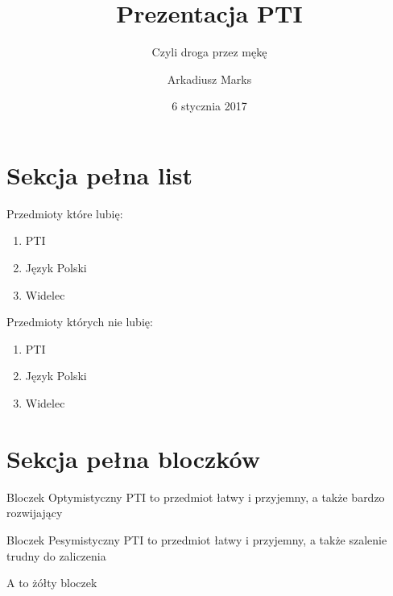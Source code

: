 \documentclass{beamer}
\title{Prezentacja PTI}
\subtitle {Czyli droga przez mękę}
\author{Arkadiusz Marks}
\institute{AiR I}
\date{6 stycznia 2017}
\begin{document}
\begin{frame}
	\maketitle
\end{frame}

\begin{frame} %
	\tableofcontents
\end{frame}


\section{Sekcja pełna list} 


\begin{frame}
	Przedmioty które lubię:
	\begin{enumerate}
		\item<1-> PTI
		\item<2-> Język Polski
		\item<3->	Widelec
	\end{enumerate}
\end{frame}

\begin{frame}
	Przedmioty których nie lubię:
	\begin{enumerate}
		\item<1-1> PTI
		\item<2-2> Język Polski
		\item<3-3>	Widelec
	\end{enumerate}
\end{frame}
 
\section{Sekcja pełna bloczków}


\begin{frame}
	{
		\begin{block}{Bloczek Optymistyczny}
		PTI to przedmiot łatwy i przyjemny, a także \alert{bardzo rozwijający}
		\end{block}
	}
	{
		\begin{block}{Bloczek Pesymistyczny}
		 PTI to przedmiot łatwy i przyjemny, a także \alert{szalenie trudny do zaliczenia}
		\end{block}
	}
	{
		\begin{block}{}
		 A to żółty bloczek
		\end{block}
	}
\end{frame}
\end{document}
